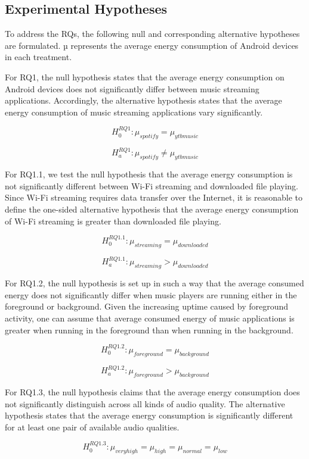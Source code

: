 \subsection{Experimental Hypotheses}
To address the RQs, the following null and corresponding alternative hypotheses are formulated. µ represents the average energy consumption of Android devices in each treatment.

For RQ1, the null hypothesis states that the average energy consumption on Android devices does not significantly differ between music streaming applications. Accordingly, the alternative hypothesis states that the average energy consumption of music streaming applications vary significantly. 

$$H_0^{RQ1}: \mu _{spotify} = \mu _{ytbmusic}$$

$$H_a^{RQ1}: \mu _{spotify} \ne \mu _{ytbmusic}$$

For RQ1.1, we test the null hypothesis that the average energy consumption is not significantly different between Wi-Fi streaming and downloaded file playing. Since Wi-Fi streaming requires data transfer over the Internet, it is reasonable to define the one-sided alternative hypothesis that the average energy consumption of Wi-Fi streaming is greater than downloaded file playing. 


$$H_0^{RQ1.1}: \mu _{streaming} = \mu _{downloaded}$$

$$H_a^{RQ1.1}: \mu _{streaming} > \mu _{downloaded}$$

For RQ1.2, the null hypothesis is set up in such a way that the average consumed energy does not significantly differ when music players are running either in the foreground or background. Given the increasing uptime caused by foreground activity, one can assume that average consumed energy of music applications is greater when running in the foreground than when running in the background.

$$H_0^{RQ1.2}: \mu _{foreground} = \mu _{background}$$

$$H_a^{RQ1.2}: \mu _{foreground} > \mu _{background}$$

For RQ1.3, the null hypothesis claims that the average energy consumption does not significantly distinguish across all kinds of audio quality. The alternative hypothesis states that the average energy consumption is significantly different for at least one pair of available audio qualities. 

$$H_0^{RQ1.3}: \mu _{veryhigh} = \mu _{high} = \mu _{normal} = \mu _{low}$$

